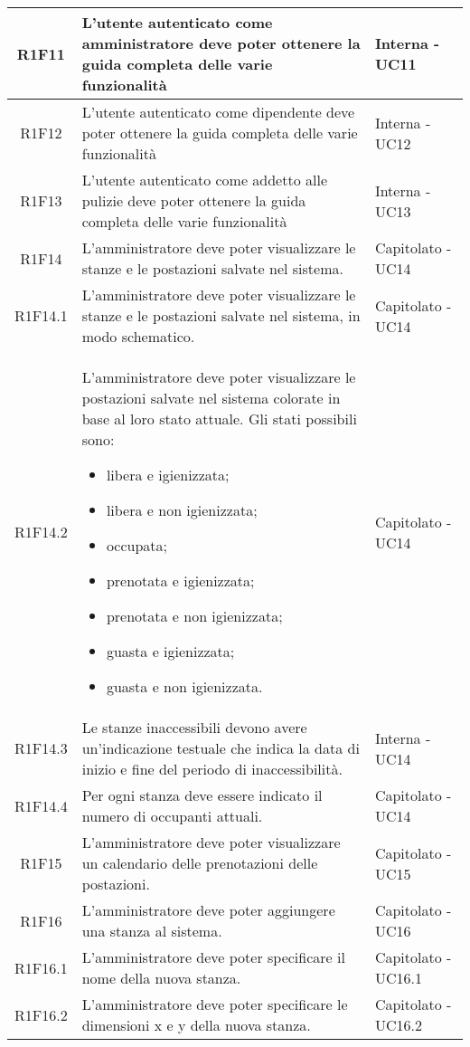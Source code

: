 \begin{center}
\begin{longtable}{|c|p{10cm}|p{4cm}|}
		\hline
		R1F11	&	L'utente autenticato come amministratore deve poter ottenere la guida completa delle varie funzionalità& Interna - UC11	\\
		\hline
		R1F12	&	L'utente autenticato come dipendente deve poter ottenere la guida completa delle varie funzionalità& Interna - UC12	\\
		\hline
		R1F13	&	L'utente autenticato come addetto alle pulizie deve poter ottenere la guida completa delle varie funzionalità& Interna - UC13	\\
		\hline
		R1F14&L'amministratore deve poter visualizzare le stanze e le postazioni salvate nel sistema.& Capitolato - UC14	\\
		\hline
		R1F14.1&L'amministratore deve poter visualizzare le stanze e le postazioni salvate nel sistema, in modo schematico.& Capitolato - UC14	\\
		\hline
		R1F14.2&L'amministratore deve poter visualizzare le postazioni salvate nel sistema colorate in base al loro stato attuale. Gli stati possibili sono:
		\begin{itemize}
			\item libera e igienizzata;
			\item libera e non igienizzata;
			\item occupata;
			\item prenotata e igienizzata;
			\item prenotata e non igienizzata;
			\item guasta e igienizzata;
			\item guasta e non igienizzata.
		\end{itemize}
		& Capitolato - UC14	\\
		\hline
		R1F14.3&Le stanze inaccessibili devono avere un'indicazione testuale che indica la data di inizio e fine del periodo di inaccessibilità. & Interna - UC14	\\
		\hline
		R1F14.4&Per ogni stanza deve essere indicato il numero di occupanti attuali.	& Capitolato - UC14	\\
		\hline
		R1F15&L'amministratore deve poter visualizzare un calendario delle prenotazioni delle postazioni.	& Capitolato - UC15	\\
		\hline
		R1F16&L'amministratore deve poter aggiungere una stanza al sistema.	& Capitolato - UC16	\\
		\hline
		R1F16.1&L'amministratore deve poter specificare il nome della nuova stanza.	& Capitolato - UC16.1	\\
		\hline
		R1F16.2&L'amministratore deve poter specificare le dimensioni x e y della nuova stanza.	& Capitolato - UC16.2	\\

\end{longtable}
\end{center}
